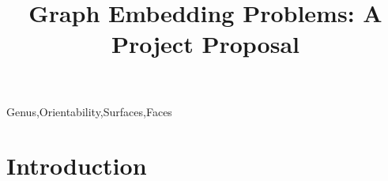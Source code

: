 \documentclass[12pt,conference]{IEEEtran}
\begin{document}
\raggedbottom

\title{Graph Embedding Problems: A Project Proposal}

\author{
}

\maketitle

\begin{abstract}

\end{abstract}

\begin{IEEEkeywords}
Genus,Orientability,Surfaces,Faces
\end{IEEEkeywords}

\section{Introduction}



\begin{thebibliography}{1}
\bibitem{}
\end{thebibliography}
\end{document}
